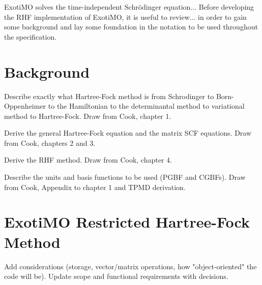 \label{Restricted_Hartree-Fock}

ExotiMO solves the time-independent Schr\"{o}dinger equation... Before 
developing the RHF implementation of ExotiMO, it is useful to review... in order to
gain some background and lay some foundation in the notation to be used throughout the
specification.

\section{Background}
\begin{TODO}
Describe exactly what Hartree-Fock method is from Schrodinger to Born-Oppenheimer to 
the Hamiltonian to the determinantal method to variational method to Hartree-Fock. 
Draw from Cook, chapter 1.
\end{TODO}

\begin{TODO}
Derive the general Hartree-Fock equation and the matrix SCF equations. Draw from Cook, 
chapters 2 and 3.
\end{TODO}

\begin{TODO}
Derive the RHF method. Draw from Cook, chapter 4.
\end{TODO}

\begin{TODO}
Describe the units and basis functions to be used (PGBF and CGBFs). Draw from Cook, Appendix to 
chapter 1 and TPMD derivation.
\end{TODO}



\section{ExotiMO Restricted Hartree-Fock Method}
\begin{TODO}
Add considerations (storage, vector/matrix operations, how "object-oriented" the code will be).
Update scope and functional requirements with decisions.
\end{TODO}


